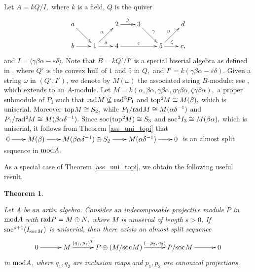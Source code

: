 \documentclass[10pt]{amsart}
\newtheorem{Theo}{Theorem}[subsection]
\theoremstyle{definition}
\newcommand{\mmod}{{\rm mod}}
\newcommand{\rad}{{\rm rad}\hspace{.5pt}}
\newcommand{\soc}{{\rm soc}\hspace{.5pt}}
\newcommand{\ntop}{{\rm top}\hspace{.5pt}}
\begin{document}
\vspace{5pt}

 Let $A=kQ/I,$ where $k$ is a field, $Q$ is the quiver \vspace{-5pt}
$$\xymatrix@!=8pt{a\ar[dr] && 2 \ar[r]^\beta & 3 \ar[dr]^\gamma && d \\ b \ar[r] & 1 \ar[ur]^\alpha \ar[r]^\delta &4\ar[rr]^\varepsilon && 5\ar[ur]^\eta \ar[r]^\zeta & c,}\vspace{-5pt}$$ and $I=\langle \gamma \beta\alpha-\varepsilon \delta\rangle.$ 
Note that $B=kQ'/I'$ is a special biserial algebra as defined in \cite{SKW}, where $Q'$ is the convex hull of $1$ and $5$ in $Q,$ and $I'=k(\gamma \beta\alpha-\varepsilon \delta).$ Given a string $\omega$ in $(Q', I')$, we denote by $M(\omega)$ the associated string $B$-module; see \cite{HuL}, which extends to an $A$-module. Let $M=k(\alpha, \beta \alpha, \gamma \beta \alpha, \eta\gamma \beta \alpha, \zeta \gamma \beta \alpha),$ a proper submodule of $P_1$ such that  $\rad M\not\subseteq \rad^3\hspace{-1pt}P_1$ and $\ntop^2\hspace{-1pt}M\cong M(\beta),$ which is uniserial. Moreover $\ntop M\cong S_2,$ while $P_1/\rad M\cong M(\alpha\delta^{-1})$ and $P_1/\rad^2\hspace{-1pt}M\cong M(\beta\alpha \delta^{-1}).$ Since $\soc(\ntop^2\hspace{-1pt}M)\cong S_3$ and $\soc^3I_3\cong M(\beta \alpha),$ which is uniserial, \vspace{-1.5pt} it follows from Theorem \ref{ass_uni_topi} that $\xymatrixcolsep{20pt}\xymatrix{
0 \ar[r] & M(\beta) \ar[r]& M(\beta\alpha \delta^{-1}) \oplus S_2 \ar[r] & M(\alpha\delta^{-1}) \ar[r] & 0}$ is an almost split sequence in $\mmod A.$

\smallskip

As a special case of Theorem \ref{ass_uni_topi}, we obtain the following useful result.

\begin{Theo}\label{ass_st_mod}

Let $A$ be an artin algebra. Consider an indecomposable projective module $P$ in $\mmod A$ with $\rad P=M\oplus N,$ where $M$ is uniserial of length $s >0$. If $\soc^{s+1}(I_{\soc M})$ is uniserial, then there exists an almost split sequence \vspace{-5.5pt}
$$\xymatrixcolsep{30pt}\xymatrix{
0 \ar[r] & M \ar[r]^-{(q_1, \,p_1)^T}& P \oplus (M/\soc M) \ar[r]^-{(-p_2, \,q_2)} & P/\soc M \ar[r] & 0
}\vspace{-5pt}$$ in $\mmod A$, where $q_1, q_2$ are inclusion maps,and $p_1, p_2$ are canonical projections. 

\end{Theo}
\end{document}
